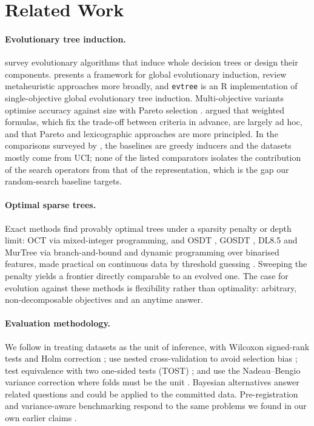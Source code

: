 \documentclass[11pt]{article}
\begin{document}
\section{Related Work}
\label{sec:related}

\paragraph{Evolutionary tree induction.} \citet{barros2012} survey evolutionary algorithms
that induce whole decision trees or design their components. \citet{kretowski2019}
presents a framework for global evolutionary induction, \citet{rivera2022} review
metaheuristic approaches more broadly, and \texttt{evtree} \citep{grubinger2014} is an R
implementation of single-objective global evolutionary tree induction. Multi-objective
variants optimise accuracy against size with Pareto selection \citep{zhao2007}.
\citet{freitas2004} argued that weighted formulas, which fix the trade-off between
criteria in advance, are largely ad hoc, and that Pareto and lexicographic approaches are
more principled. In the comparisons surveyed by \citet{barros2012}, the baselines are
greedy inducers and the datasets mostly come from UCI; none of the listed comparators
isolates the contribution of the search operators from that of the representation, which
is the gap our random-search baseline targets.

\paragraph{Optimal sparse trees.} Exact methods find provably optimal trees under a
sparsity penalty or depth limit: OCT \citep{bertsimas2017} via mixed-integer programming,
and OSDT \citep{hu2019}, GOSDT \citep{lin2020}, DL8.5 \citep{aglin2020} and MurTree
\citep{demirovic2022} via branch-and-bound and dynamic programming over binarised
features, made practical on continuous data by threshold guessing \citep{mctavish2022}.
Sweeping the penalty yields a frontier directly comparable to an evolved one. The case
for evolution against these methods is flexibility rather than optimality: arbitrary,
non-decomposable objectives and an anytime answer.

\paragraph{Evaluation methodology.} We follow \citet{demsar2006} in treating datasets as
the unit of inference, with Wilcoxon signed-rank tests and Holm correction
\citep{holm1979}; use nested cross-validation to avoid selection bias
\citep{varma2006,cawley2010}; test equivalence with two one-sided tests (TOST)
\citep{schuirmann1987}; and use the Nadeau--Bengio variance correction where folds must be
the unit \citep{nadeau2003}. Bayesian alternatives \citep{benavoli2017} answer related
questions and could be applied to the committed data. Pre-registration \citep{nosek2018}
and variance-aware benchmarking \citep{bouthillier2021} respond to the same problems we
found in our own earlier claims \citep{lipton2019}.
\end{document}
